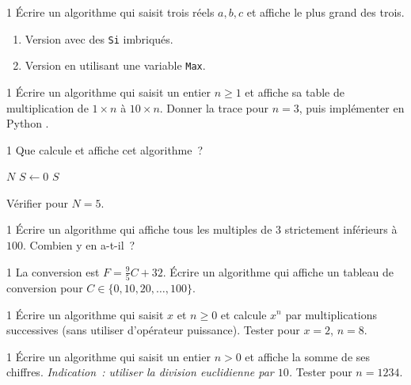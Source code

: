 \begin{exo}{1}
\'Ecrire un algorithme qui saisit trois r\'eels $a, b, c$ et affiche
le plus grand des trois.
\begin{enumerate}
  \item Version avec des \texttt{Si} imbriqu\'es.
  \item Version en utilisant une variable \texttt{Max}.
\end{enumerate}
\end{exo}

\begin{exo}{1}
\'Ecrire un algorithme qui saisit un entier $n \geq 1$ et affiche
sa table de multiplication de $1\times n$ \`a $10\times n$.
Donner la trace pour $n=3$, puis impl\'ementer en Python \computer.
\end{exo}

\begin{exo}{1}
Que calcule et affiche cet algorithme~?

\begin{algorithm}[H]
\Lire $N$\;
$S \leftarrow 0$\;
\Afficher $S$\;
\end{algorithm}

V\'erifier pour $N=5$.
\end{exo}

\begin{exo}{1}
\'Ecrire un algorithme qui affiche tous les multiples de $3$
strictement inf\'erieurs \`a $100$.
Combien y en a-t-il~?
\end{exo}

\begin{exo}{1}
La conversion est $F = \frac{9}{5}C + 32$.
\'Ecrire un algorithme qui affiche un tableau de conversion pour
$C \in \{0, 10, 20, \ldots, 100\}$.
\end{exo}

\begin{exo}{1}
\'Ecrire un algorithme qui saisit $x$ et $n \geq 0$ et calcule $x^n$
par multiplications successives (sans utiliser d'op\'erateur puissance).
Tester pour $x=2$, $n=8$.
\end{exo}

\begin{exo}{1}
\'Ecrire un algorithme qui saisit un entier $n > 0$ et affiche la somme
de ses chiffres.
\emph{Indication~: utiliser la division euclidienne par $10$.}
Tester pour $n = 1234$.
\end{exo}


